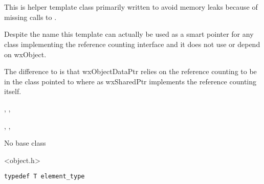 \section{}\label{wxobjectdataptr}

This is helper template class primarily written to avoid memory 
leaks because of missing calls to .

Despite the name this template can actually be used as a
smart pointer for any class implementing the reference
counting interface and it does not use or depend on wxObject.

The difference to  is that
wxObjectDataPtr relies on the reference counting to be in
the class pointed to where as wxSharedPtr implements the
reference counting itself.


,
,

, 
,



No base class


<object.h>


{\small%
\begin{verbatim}
typedef T element_type
\end{verbatim}
}%



